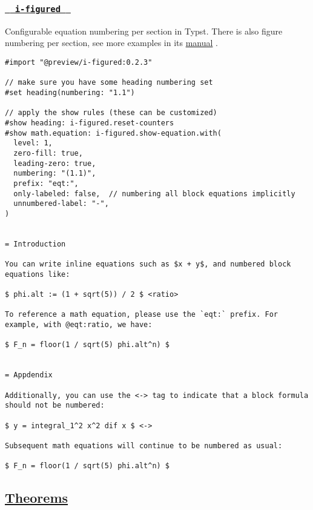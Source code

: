 \pandocbounded{}

\subsubsection{\texorpdfstring{\hyperref[i-figured]{\texttt{\ }{\texttt{\ i-figured\ }}\texttt{\ }}}{  i-figured  }}\label{i-figured}

Configurable equation numbering per section in Typst. There is also
figure numbering per section, see more examples in its
\href{https://github.com/RubixDev/typst-i-figured}{manual} .

\begin{verbatim}
#import "@preview/i-figured:0.2.3"

// make sure you have some heading numbering set
#set heading(numbering: "1.1")

// apply the show rules (these can be customized)
#show heading: i-figured.reset-counters
#show math.equation: i-figured.show-equation.with(
  level: 1,
  zero-fill: true,
  leading-zero: true,
  numbering: "(1.1)",
  prefix: "eqt:",
  only-labeled: false,  // numbering all block equations implicitly
  unnumbered-label: "-",
)


= Introduction

You can write inline equations such as $x + y$, and numbered block equations like:

$ phi.alt := (1 + sqrt(5)) / 2 $ <ratio>

To reference a math equation, please use the `eqt:` prefix. For example, with @eqt:ratio, we have:

$ F_n = floor(1 / sqrt(5) phi.alt^n) $


= Appdendix

Additionally, you can use the <-> tag to indicate that a block formula should not be numbered:

$ y = integral_1^2 x^2 dif x $ <->

Subsequent math equations will continue to be numbered as usual:

$ F_n = floor(1 / sqrt(5) phi.alt^n) $
\end{verbatim}

\pandocbounded{}

\subsection{\texorpdfstring{\hyperref[theorems]{Theorems}}{Theorems}}\label{theorems}

